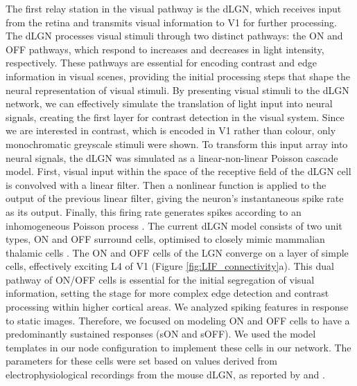 \documentclass[12pt]{article}
\begin{document}
The first relay station in the visual pathway is the dLGN, which receives input from the retina and transmits visual information to V1 for further processing. The dLGN processes visual stimuli through two distinct pathways: the ON and OFF pathways, which respond to increases and decreases in light intensity, respectively. These pathways are essential for encoding contrast and edge information in visual scenes, providing the initial processing steps that shape the neural representation of visual stimuli. By presenting visual stimuli to the dLGN network, we can effectively simulate the translation of light input into neural signals, creating the first layer for contrast detection in the visual system. Since we are interested in contrast, which is encoded in V1 rather than colour, only monochromatic greyscale stimuli were shown. To transform this input array into neural signals, the dLGN was simulated as a linear-non-linear Poisson cascade model. First, visual input within the space of the receptive field of the dLGN cell is convolved with a linear filter. Then a nonlinear function is applied to the output of the previous linear filter, giving the neuron's instantaneous spike rate as its output. Finally, this firing rate generates spikes according to an inhomogeneous Poisson process \autocite{moskovitzComparisonDeepLearning2018}. The current dLGN model consists of two unit types, ON and OFF surround cells, optimised to closely mimic mammalian thalamic cells \autocite{billehSystematicIntegrationStructural2020}. The ON and OFF cells of the LGN converge on a layer of simple cells, effectively exciting L4 of V1 (Figure \ref{fig:LIF_connectivity}a). This dual pathway of ON/OFF cells is essential for the initial segregation of visual information, setting the stage for more complex edge detection and contrast processing within higher cortical areas. We analyzed spiking features in response to static images. Therefore, we focused on modeling ON and OFF cells to have a predominantly sustained responses (sON and sOFF). We used the model templates in our node configuration to implement these cells in our network. The parameters for these cells were set based on values derived from electrophysiological recordings from the mouse dLGN, as reported by \textcite{durandComparisonVisualResponse2016} and \textcite{billehSystematicIntegrationStructural2020}.
\end{document}

